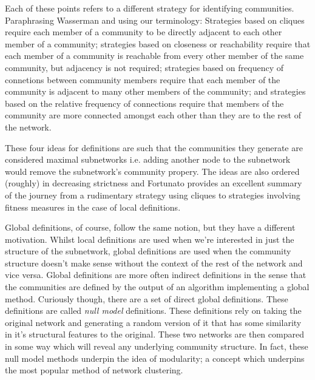 Each of these points refers to a different strategy for identifying communities. Paraphrasing Wasserman and using our terminology: Strategies based on cliques require each member of a community to be directly adjacent to each other member of a community; strategies based on closeness or reachability require that each member of a community is reachable from every other member of the same community, but adjacency is not required; strategies based on frequency of connetions between community members require that each member of the community is adjacent to many other members of the community; and strategies based on the relative frequency of connections require that members of the community are more connected amongst each other than they are to the rest of the network.

These four ideas for definitions are such that the communities they generate are considered maximal subnetworks i.e. adding another node to the subnetwork would remove the subnetwork's community propery. The ideas are also ordered (roughly) in decreasing strictness and Fortunato provides an excellent summary of the journey from a rudimentary strategy using cliques to strategies involving fitness measures in the case of local definitions.\cite[3.2.2]{fortunato}

Global definitions, of course, follow the same notion, but they have a different motivation. Whilst local definitions are used when we're interested in just the structure of the subnetwork, global definitions are used when the community structure doesn't make sense without the context of the rest of the network and vice versa. Global definitions are more often indirect definitions in the sense that the communities are defined by the output of an algorithm implementing a global method. Curiously though, there are a set of direct global definitions. These definitions are called \emph{null model} definitions. These definitions rely on taking the original network and generating a random version of it that has some similarity in it's structural features to the original. These two networks are then compared in some way which will reveal any underlying community structure. In fact, these null model methods underpin the idea of modularity; a concept which underpins the most popular method of network clustering.

